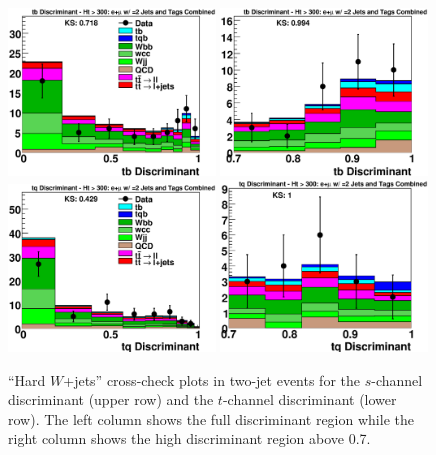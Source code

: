 \clearpage
\begin{figure}[!h!tbp]
\includegraphics[width=0.49\textwidth]
{eps/MatrixElement/cross_check/combined/2jet/TTbar_tb_Discriminant}
\includegraphics[width=0.49\textwidth]
{eps/MatrixElement/cross_check/combined/2jet/TTbar_tb_Discriminant_Zoom}
\includegraphics[width=0.49\textwidth]
{eps/MatrixElement/cross_check/combined/2jet/TTbar_tq_Discriminant}
\includegraphics[width=0.49\textwidth]
{eps/MatrixElement/cross_check/combined/2jet/TTbar_tq_Discriminant_Zoom}
\vspace{-0.1in}
\caption{``Hard $W$+jets'' cross-check plots in two-jet
events for the $s$-channel discriminant (upper row) and the $t$-channel discriminant
(lower row). The left column shows the full discriminant region while
the right column shows the high discriminant region above 0.7.}
\label{ttbar-cross-2jet}
\end{figure}

